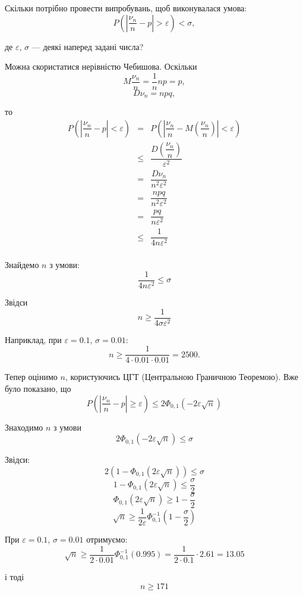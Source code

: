 \begin{example}[Продовження]
    Скільки потрібно провести випробувань, щоб
    виконувалася умова:
    $$P\left( \left| \dfrac{\nu_n}{n} - p \right| > \varepsilon \right) < \sigma,$$

    де $\varepsilon$, $\sigma$ --- деякі наперед задані числа?

    Можна скористатися нерівністю Чебишова.
    Оскільки
    $$M \dfrac{\nu_n}{n} = \dfrac{1}{n} np = p,$$
    $$D \nu_n = npq,$$
    
    то
    $$\begin{array}{rcl}
        P\left(\left|\dfrac{\nu_n}{n} - p\right| < \varepsilon \right)
        & = & P\left(\left|\dfrac{\nu_n}{n} - M\left(\dfrac{\nu_n}{n}\right) \right| < \varepsilon \right) \\
        & \leqslant & \dfrac{D\left(\dfrac{\nu_n}{n}\right)}{\varepsilon^2} \\
        & = & \dfrac{D\nu_n}{n^2 \varepsilon^2} \\
        & = & \dfrac{npq}{n^2 \varepsilon^2} \\
        & = & \dfrac{pq}{n \varepsilon^2} \\
        & \leqslant & \dfrac{1}{4 n \varepsilon^2} \\
    \end{array}$$
    
    Знайдемо $n$ з умови:
    $$\dfrac{1}{4 n \varepsilon^2} \leqslant \sigma$$
    
    Звідси 
    $$n \geqslant \dfrac{1}{4 \sigma \varepsilon^2}$$
    
    Наприклад, при $\varepsilon = 0.1$, $\sigma = 0.01$:
    $$n \geqslant \dfrac{1}{4 \cdot 0.01 \cdot 0.01} = 2 500.$$
    
    Тепер оцінимо $n$, користуючись ЦГТ (Центральною Граничною Теоремою).
    Вже було показано, що
    $$P\left(\left|\dfrac{\nu_n}{n} - p\right| \geqslant \varepsilon \right)
    \leqslant 2 \Phi_{0, 1}(- 2 \varepsilon \sqrt{n})$$
    
    Знаходимо $n$ з умови
    $$2 \Phi_{0, 1}(- 2 \varepsilon \sqrt{n}) \leqslant \sigma$$
    
    Звідси:
    $$2 (1 -  \Phi_{0, 1}(2 \varepsilon \sqrt{n})) \leqslant \sigma$$
    $$1 -  \Phi_{0, 1}(2 \varepsilon \sqrt{n}) \leqslant \dfrac{\sigma}{2}$$
    $$\Phi_{0, 1}(2 \varepsilon \sqrt{n}) \geqslant 1 - \dfrac{\sigma}{2}$$
    $$\sqrt{n} \geqslant \dfrac{1}{2 \varepsilon} \Phi_{0, 1}^{-1}(1 - \dfrac{\sigma}{2})$$
    
    При $\varepsilon = 0.1$, $\sigma = 0.01$ отримуємо:
    $$\sqrt{n}
    \geqslant \dfrac{1}{2 \cdot 0.01} \Phi_{0, 1}^{-1}(0.995)
    = \dfrac{1}{2 \cdot 0.1} \cdot 2.61
    = 13.05$$
    
    і тоді
    $$n \geqslant 171$$
\end{example}

